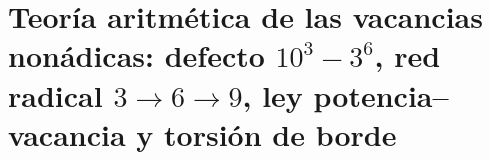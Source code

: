 \chapter{Teoría aritmética de las vacancias nonádicas: defecto \(10^3-3^6\), red radical \(3\to6\to9\), ley potencia--vacancia y torsión de borde}
\label{chap:p3-final:47:vacancias_nonadicas}


